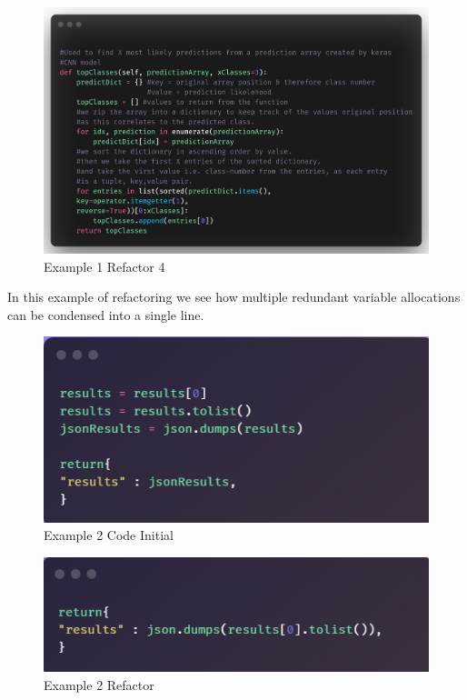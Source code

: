       \begin{figure}[H]
        \begin{center}
          \includegraphics[scale=0.55]{Images/Refactor/refactorA4}
          \caption{Example 1 Refactor 4}
          \label{fig:refactorA3}
        \end{center}
      \end{figure}

      In this example of refactoring we see how multiple redundant variable allocations can be condensed into a single line.
      \begin{figure}[H]
        \begin{center}
          \includegraphics[scale=0.55]{Images/Refactor/refactorB1}
          \caption{Example 2 Code Initial}
          \label{fig:refactorA3}
        \end{center}
      \end{figure}

      \begin{figure}[H]
        \begin{center}
          \includegraphics[scale=0.55]{Images/Refactor/refactorB2}
          \caption{Example 2 Refactor}
          \label{fig:refactorA3}
        \end{center}
      \end{figure}

